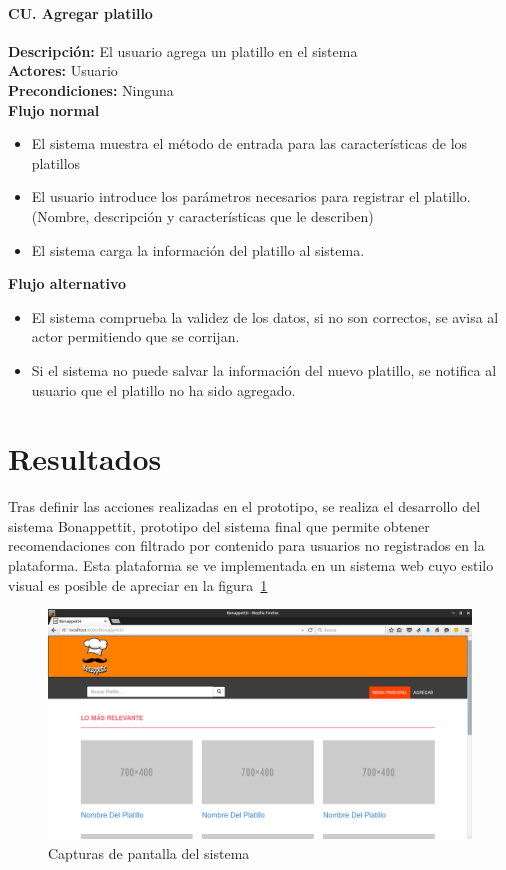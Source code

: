 			\paragraph{CU. Agregar platillo\\}
				\textbf{Descripción:} El usuario agrega un platillo en el sistema\\
				\textbf{Actores:} Usuario\\
				\textbf{Precondiciones:} Ninguna\\
				\textbf{Flujo normal}\\
				\begin{itemize}
					\item El sistema muestra el método de entrada para las características de los platillos
					\item El usuario introduce los parámetros necesarios para registrar el platillo. (Nombre, descripción y características que le describen)
					\item El sistema carga la información del platillo al sistema.
				\end{itemize}
				\textbf{Flujo alternativo}\\
				\begin{itemize}
					\item El sistema comprueba la validez de los datos, si no son correctos, se avisa al actor permitiendo que se corrijan. 
					\item Si el sistema no puede salvar la información del nuevo platillo, se notifica al usuario que el platillo no ha sido agregado.
				\end{itemize}
				    
				\section{Resultados}
				Tras definir las acciones realizadas en el prototipo, se realiza el desarrollo del sistema Bonappettit, prototipo del sistema final que permite obtener recomendaciones con filtrado por contenido para usuarios no registrados en la plataforma. Esta plataforma se ve implementada en un sistema web cuyo estilo visual es posible de apreciar en la figura~\ref{fig: screenshot1 p2}\\
				\begin{figure}[h!]
					\centering
					\includegraphics[width=16cm]{./images/bonappettit.png}
					\caption{Capturas de pantalla del sistema}
					\label{fig: screenshot1 p2}
				\end{figure}
				
